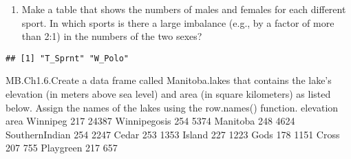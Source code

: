 \documentclass[
]{article}
\newenvironment{Shaded}{\begin{snugshade}}{\end{snugshade}}
\newcommand{\DataTypeTok}[1]{\textcolor[rgb]{0.13,0.29,0.53}{#1}}
\newcommand{\DecValTok}[1]{\textcolor[rgb]{0.00,0.00,0.81}{#1}}
\newcommand{\KeywordTok}[1]{\textcolor[rgb]{0.13,0.29,0.53}{\textbf{#1}}}
\newcommand{\NormalTok}[1]{#1}
\newcommand{\OperatorTok}[1]{\textcolor[rgb]{0.81,0.36,0.00}{\textbf{#1}}}
\newcommand{\StringTok}[1]{\textcolor[rgb]{0.31,0.60,0.02}{#1}}
\providecommand{\tightlist}{%
  \setlength{\itemsep}{0pt}\setlength{\parskip}{0pt}}
\begin{document}
\begin{enumerate}
\def\labelenumi{(\alph{enumi})}
\setcounter{enumi}{1}
\tightlist
\item
  Make a table that shows the numbers of males and females for each
  different sport. In which sports is there a large imbalance (e.g., by
  a factor of more than 2:1) in the numbers of the two sexes?
\end{enumerate}

\begin{Shaded}
\end{Shaded}

\begin{verbatim}
## [1] "T_Sprnt" "W_Polo"
\end{verbatim}

MB.Ch1.6.Create a data frame called Manitoba.lakes that contains the
lake's elevation (in meters above sea level) and area (in square
kilometers) as listed below. Assign the names of the lakes using the
row.names() function. elevation area Winnipeg 217 24387 Winnipegosis 254
5374 Manitoba 248 4624 SouthernIndian 254 2247 Cedar 253 1353 Island 227
1223 Gods 178 1151 Cross 207 755 Playgreen 217 657
\end{document}
